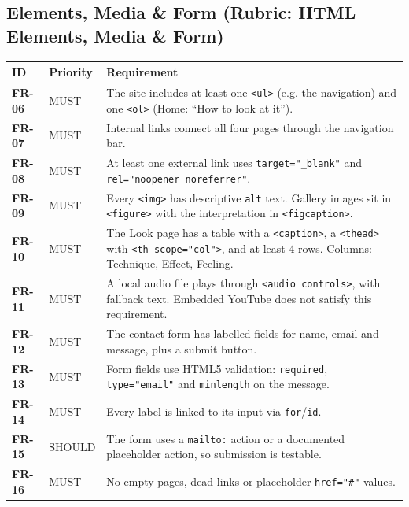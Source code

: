 \documentclass[11pt,a4paper]{article}
\newcommand{\req}[3]{\textbf{\color{accent}#1} & #2 & #3 \\}
\begin{document}
\subsection{Elements, Media \& Form (Rubric: HTML Elements, Media \& Form)}
\begin{longtable}{@{}p{1.6cm}p{1.6cm}p{12.3cm}@{}}
\toprule
\textbf{ID} & \textbf{Priority} & \textbf{Requirement} \\
\midrule
\endhead
\req{FR-06}{MUST}{The site includes at least one \texttt{<ul>} (e.g. the navigation) and one \texttt{<ol>} (Home: ``How to look at it'').}
\req{FR-07}{MUST}{Internal links connect all four pages through the navigation bar.}
\req{FR-08}{MUST}{At least one external link uses \texttt{target="\_blank"} and \texttt{rel="noopener noreferrer"}.}
\req{FR-09}{MUST}{Every \texttt{<img>} has descriptive \texttt{alt} text. Gallery images sit in \texttt{<figure>} with the interpretation in \texttt{<figcaption>}.}
\req{FR-10}{MUST}{The Look page has a table with a \texttt{<caption>}, a \texttt{<thead>} with \texttt{<th scope="col">}, and at least 4 rows. Columns: Technique, Effect, Feeling.}
\req{FR-11}{MUST}{A local audio file plays through \texttt{<audio controls>}, with fallback text. Embedded YouTube does not satisfy this requirement.}
\req{FR-12}{MUST}{The contact form has labelled fields for name, email and message, plus a submit button.}
\req{FR-13}{MUST}{Form fields use HTML5 validation: \texttt{required}, \texttt{type="email"} and \texttt{minlength} on the message.}
\req{FR-14}{MUST}{Every label is linked to its input via \texttt{for}/\texttt{id}.}
\req{FR-15}{SHOULD}{The form uses a \texttt{mailto:} action or a documented placeholder action, so submission is testable.}
\req{FR-16}{MUST}{No empty pages, dead links or placeholder \texttt{href="\#"} values.}
\bottomrule
\end{longtable}
\end{document}
